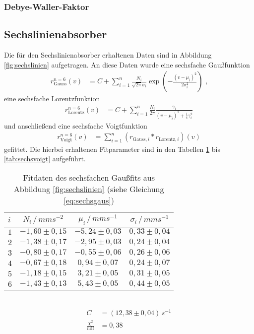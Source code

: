 \subsubsection{Debye-Waller-Faktor}



\subsection{Sechslinienabsorber}

Die für den Sechslinienabsorber erhaltenen Daten sind in Abbildung \ref{fig:sechslinien} aufgetragen. An diese Daten wurde eine sechsfache Gaußfunktion
\begin{align}
r_\mathrm{Gauss}^{n=6}(v)&=C+\sum_{i=1}^n\frac{N_i}{\sqrt{2\pi}\sigma_i}\exp(-\frac{(v-\mu_i)^2}{2\sigma_i^2})\text{ ,}\label{eq:sechsgaus}
\end{align}
eine sechsfache Lorentzfunktion 
\begin{align}
r_\mathrm{Lorentz}^{n=6}(v)&=C+\sum_{i=1}^n\frac{N_i}{2\pi}\frac{\gamma_i}{\left(v-\mu_i\right)^2+\frac14\gamma_i^2}\label{eq:sechslorentz}
\end{align}
und anschließend eine sechsfache Voigtfunktion 
\begin{align}
r_\mathrm{Voigt}^{n=6}(v)&=\sum_{i=1}^n\left(r_{\mathrm{Gauss}, i}*r_{\mathrm{Lorentz}, i}\right)(v)\label{eq:sechsvoigt}
\end{align}
gefittet. Die hierbei erhaltenen Fitparameter sind in den Tabellen \ref{tab:sechsgaus} bis \ref{tab:sechsvoigt} aufgeführt.

\begin{table}[h!]
	\centering
	\begin{tabular}{l|ccc}
		$i$&$N_i\,/\,\si{mms^{-2}}$&$\mu_i\,/\,\si{mms^{-1}}$&$\sigma_i\,/\,\si{mms^{-1}}$\\\hline
		$1$&$-1,60\pm0,15$&$-5,24\pm0,03$&$0,33\pm0,04$\\
		$2$&$-1,38\pm0,17$&$-2,95\pm0,03$&$0,24\pm0,04$\\
		$3$&$-0,80\pm0,17$&$-0,55\pm0,06$&$0,26\pm0,06$\\
		$4$&$-0,67\pm0,18$&$ 0,94\pm0,07$&$0,24\pm0,07$\\
		$5$&$-1,18\pm0,15$&$ 3,21\pm0,05$&$0,31\pm0,05$\\
		$6$&$-1,43\pm0,13$&$ 5,43\pm0,05$&$0,44\pm0,05$\\
	\end{tabular}\\
	\begin{align*}
		C&=(12,38\pm0,04)\,\si{s^{-1}}\\
		\frac{\chi^2}{\mathrm{ndf}}&=0,38
	\end{align*}
	\caption{Fitdaten des sechsfachen Gaußfits aus Abbildung \ref{fig:sechslinien} (siehe Gleichung \ref{eq:sechsgaus})}
	\label{tab:sechsgaus}
\end{table}

